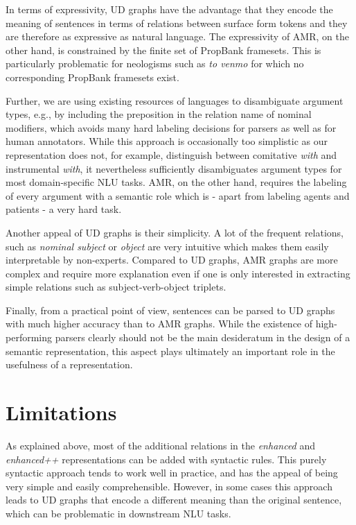\documentclass[10pt, a4paper]{article}
\begin{document}
In terms of expressivity, UD graphs have the advantage that they encode the meaning of sentences in terms of relations between surface form tokens and they are therefore as expressive as natural language. The expressivity of AMR, on the other hand, is constrained by the finite set of PropBank framesets. This is particularly problematic for neologisms such as \textit{to venmo} for which no corresponding PropBank framesets exist.

Further, we are using existing resources of languages to disambiguate argument types, e.g., by including the preposition in the relation name of nominal modifiers, which avoids many hard labeling decisions for parsers as well as for human annotators. While this approach is occasionally too simplistic as our representation does not, for example, distinguish between comitative \textit{with} and instrumental \textit{with}, it nevertheless sufficiently disambiguates argument types for most domain-specific NLU tasks. AMR, on the other hand, requires the labeling of every argument with a semantic role which is - apart from labeling agents and patients - a very hard task. 

Another appeal of UD graphs is their simplicity. A lot of the frequent relations, such as \textit{nominal subject} or \textit{object} are very intuitive which makes them easily interpretable by non-experts. Compared to UD graphs, AMR graphs are more complex and require more explanation even if one is only interested in extracting simple relations such as subject-verb-object triplets.

Finally, from a practical point of view, sentences can be parsed to UD graphs with much higher accuracy than to AMR graphs. While the existence of high-performing parsers clearly should not be the main desideratum in the design of a semantic representation, this aspect plays ultimately an important role in the usefulness of a representation.



\section{Limitations}

As explained above, most of the additional relations in the \textit{enhanced} and \textit{enhanced++} representations can be added with syntactic rules. This purely syntactic approach tends to work well in practice, and has the appeal of being very simple and easily comprehensible. However, in some cases this approach leads to UD graphs that encode a different meaning than the original sentence, which
can be problematic in downstream NLU tasks.
\end{document}
